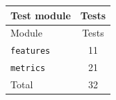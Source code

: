 \begin{longtable}{lc}\toprule
Test module & Tests \\
\midrule
\endfirsthead
\toprule Module & Tests \\ \midrule \endhead
\texttt{features} & 11 \\
\texttt{metrics} & 21 \\
\midrule Total & 32 \\
\bottomrule
\end{longtable}
